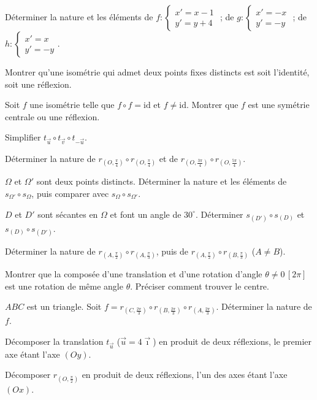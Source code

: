 \exo{} Déterminer la nature et les éléments de $f:\begin{cases}x'=x-1\\ y'=y+4\end{cases}$ ; de $g:\begin{cases}x'=-x\\ y'=-y\end{cases}$ ; de $h:\begin{cases}x'=x\\ y'=-y\end{cases}$.

\exo{} Montrer qu'une isométrie qui admet deux points fixes distincts est soit l'identité, soit une réflexion.

\exo{} Soit $f$ une isométrie telle que $f\circ f=\mathrm{id}$ et $f\neq\mathrm{id}$. Montrer que $f$ est une symétrie centrale ou une réflexion.

\exo{} Simplifier $t_{\vec u}\circ t_{\vec v}\circ t_{-\vec u}$.

\exo{} Déterminer la nature de $r_{(O,\frac\pi4)}\circ r_{(O,\frac\pi4)}$ et de $r_{(O,\frac{3\pi}4)}\circ r_{(O,\frac{5\pi}4)}$.

\exo{} $\Omega$ et $\Omega'$ sont deux points distincts. Déterminer la nature et les éléments de $s_{\Omega'}\circ s_\Omega$, puis comparer avec $s_\Omega\circ s_{\Omega'}$.

\exo{} $D$ et $D'$ sont sécantes en $\Omega$ et font un angle de $30^\circ$. Déterminer $s_{(D')}\circ s_{(D)}$ et $s_{(D)}\circ s_{(D')}$.

\exo{} Déterminer la nature de $r_{(A,\frac\pi2)}\circ r_{(A,\frac\pi3)}$, puis de $r_{(A,\frac\pi2)}\circ r_{(B,\frac\pi3)}$ ($A\neq B$).

\exo{} Montrer que la composée d'une translation et d'une rotation d'angle $\theta\neq0\,[2\pi]$ est une rotation de même angle $\theta$. Préciser comment trouver le centre.

\exo{} $ABC$ est un triangle. Soit $f=r_{(C,\frac{2\pi}3)}\circ r_{(B,\frac{2\pi}3)}\circ r_{(A,\frac{2\pi}3)}$. Déterminer la nature de $f$.

\exo{} Décomposer la translation $t_{\vec u}$ ($\vec u=4\vec\imath$) en produit de deux réflexions, le premier axe étant l'axe $(Oy)$.

\exo{} Décomposer $r_{(O,\frac\pi2)}$ en produit de deux réflexions, l'un des axes étant l'axe $(Ox)$.

